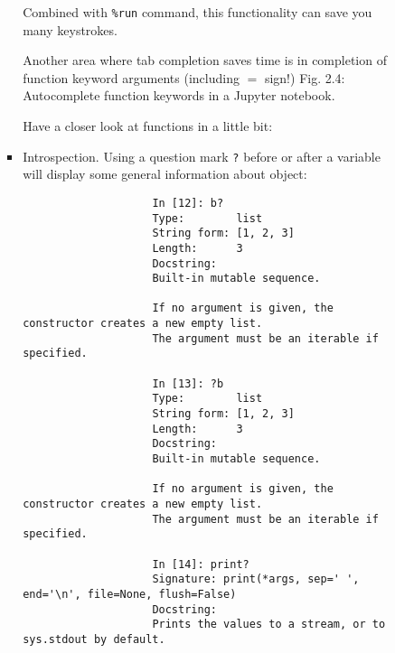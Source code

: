\documentclass{article}
\begin{document}
\begin{enumerate}
\begin{itemize}
\begin{itemize}
\begin{itemize}
				Combined with \verb|%run| command, this functionality can save you many keystrokes.
				
				Another area where tab completion saves time is in completion of function keyword arguments (including $=$ sign!) {\sf Fig. 2.4: Autocomplete function keywords in a Jupyter notebook}.
				
				Have a closer look at functions in a little bit:
				\item {\sf Introspection.} Using a question mark {\tt?} before or after a variable will display some general information about object:
				\begin{verbatim}
					In [12]: b?
					Type:        list
					String form: [1, 2, 3]
					Length:      3
					Docstring:  
					Built-in mutable sequence.
					
					If no argument is given, the constructor creates a new empty list.
					The argument must be an iterable if specified.
					
					In [13]: ?b
					Type:        list
					String form: [1, 2, 3]
					Length:      3
					Docstring:  
					Built-in mutable sequence.
					
					If no argument is given, the constructor creates a new empty list.
					The argument must be an iterable if specified.
					
					In [14]: print?
					Signature: print(*args, sep=' ', end='\n', file=None, flush=False)
					Docstring:
					Prints the values to a stream, or to sys.stdout by default.
					

\end{verbatim}
\end{itemize}
\end{itemize}
\end{itemize}
\end{enumerate}
\end{document}
